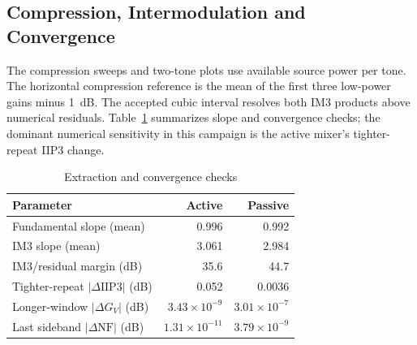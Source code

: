 


\subsection{Compression, Intermodulation and Convergence}
The compression sweeps and two-tone plots use available source power per
tone. The horizontal compression reference is the mean of the first three
low-power gains minus 1~dB. The accepted cubic interval resolves both IM3
products above numerical residuals. Table~\ref{tab:checks} summarizes slope
and convergence checks; the dominant numerical sensitivity in this campaign
is the active mixer's tighter-repeat IIP3 change.

\begin{table}[!t]
\caption{Extraction and convergence checks}
\label{tab:checks}
\centering\footnotesize
\setlength{\tabcolsep}{4pt}
\begin{tabularx}{\columnwidth}{@{}Xrr@{}}
\toprule
Parameter & Active & Passive \\
\midrule
Fundamental slope (mean) & 0.996 & 0.992 \\
IM3 slope (mean) & 3.061 & 2.984 \\
IM3/residual margin (dB) & 35.6 & 44.7 \\
Tighter-repeat $|\Delta\mathrm{IIP3}|$ (dB) & 0.052 & 0.0036 \\
Longer-window $|\Delta G_V|$ (dB) & $3.43\times10^{-9}$ & $3.01\times10^{-7}$ \\
Last sideband $|\Delta\mathrm{NF}|$ (dB) & $1.31\times10^{-11}$ & $3.79\times10^{-9}$ \\
\bottomrule
\end{tabularx}
\end{table}



